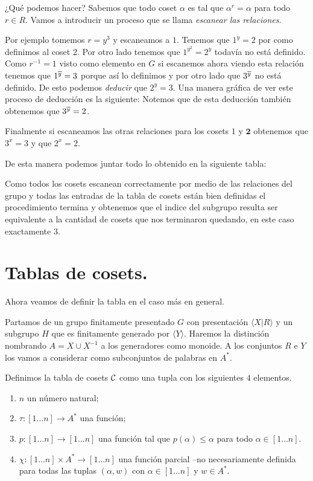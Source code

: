 \documentclass[tesis.tex]{subfiles}
\newcommand{\fg}{finitamente generado }
\newcommand{\fp}{finitamente presentado }
\begin{document}
¿Qué podemos hacer?
Sabemos que todo coset $\alpha$ es tal que $\alpha^r = \alpha$ para todo $r \in R$.
Vamos a introducir un proceso que se llama \textit{escanear las relaciones}.

Por ejemplo tomemos $r = y^3$ y escaneamos a $1$.
Tenemos que $1^y = 2$ por como definimos al coset $2$. 
Por otro lado tenemos que $1^{y^2} = 2^y$ todavía no está definido.
Como $r^{-1} = 1$ visto como elemento en $G$ si escanemos ahora viendo esta relación tenemos que $1^{\overline y} = 3$ porque así lo definimos y por otro lado que $3^{\overline y}$ no está definido.
De esto podemos \textit{deducir} que $2^y = 3$.
Una manera gráfica de ver este proceso de deducción es la siguiente:
Notemos que de esta deducción también obtenemos que $3^{\overline y} = 2$. 

Finalmente si escaneamos las otras relaciones para los cosets $1$ y $\textbf{2}$ obtenemos
que $3^x = 3$ y que $2^x = 2$.

De esta manera podemos juntar todo lo obtenido en la siguiente tabla:

Como todos los cosets escanean correctamente por medio de las relaciones del grupo y todas las entradas de la tabla de cosets están bien definidas el procedimiento termina y obtenemos que el indice del subgrupo resulta ser equivalente a la cantidad de cosets que nos terminaron quedando, en este caso exactamente $3$.
 

\section{Tablas de cosets.}

Ahora veamos de definir la tabla en el caso más en general.

Partamos de un grupo \fp $G$ con presentación $\langle X | R \rangle$ y un subgrupo $H$ que es \fg por $\langle Y \rangle$.
Haremos la distinción nombrando $A = X \cup X^{-1}$ a los generadores como monoide.
A los conjuntos $R$ e $Y$ los vamos a considerar como subconjuntos de palabras en $A^*$.

Definimos la tabla de cosets $\cal C$ como una tupla con los siguientes $4$ elementos.
\begin{enumerate}
	\item $n$ un número natural;
	\item $\tau:[1\dots n] \to A^*$ una función; 
	\item $p: [1 \dots n] \to [1 \dots n]$ una función tal que $p(\alpha) \le \alpha$ para todo $\alpha \in [1\dots n]$.
	\item $\chi:[1 \dots n]  \times A^{*} \to [1 \dots n]$ una función parcial --no necesariamente definida para todas las tuplas $(\alpha, w)$ con $\alpha \in [1 \dots n]$ y $w \in A^*$.
\end{enumerate}
\end{document}
